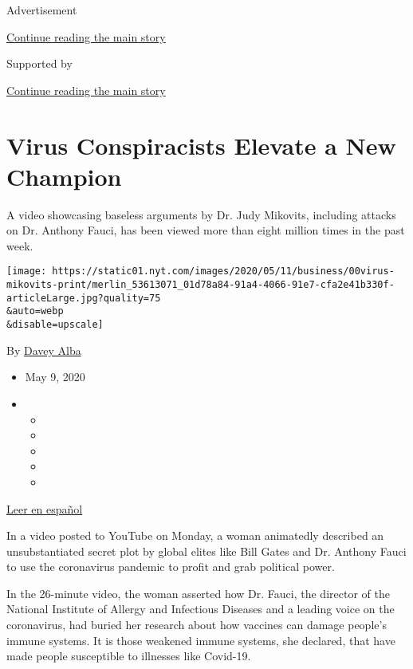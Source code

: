 Advertisement

\protect\hyperlink{after-top}{Continue reading the main story}

Supported by

\protect\hyperlink{after-sponsor}{Continue reading the main story}

\hypertarget{virus-conspiracists-elevate-a-new-champion}{%
\section{Virus Conspiracists Elevate a New
Champion}\label{virus-conspiracists-elevate-a-new-champion}}

A video showcasing baseless arguments by Dr. Judy Mikovits, including
attacks on Dr. Anthony Fauci, has been viewed more than eight million
times in the past week.

\texttt{[image: https://static01.nyt.com/images/2020/05/11/business/00virus-mikovits-print/merlin\_53613071\_01d78a84-91a4-4066-91e7-cfa2e41b330f-articleLarge.jpg?quality=75\\\&auto=webp\\\&disable=upscale]}

By \href{https://www.nytimes.com/by/davey-alba}{Davey Alba}

\begin{itemize}
\item
  May 9, 2020
\item
  \begin{itemize}
  \item
  \item
  \item
  \item
  \item
  \end{itemize}
\end{itemize}

\href{https://www.nytimes.com/es/2020/05/11/espanol/plandemia-judy-mikovitz-desinformacion.html}{Leer
en español}

In a video posted to YouTube on Monday, a woman animatedly described an
unsubstantiated secret plot by global elites like Bill Gates and Dr.
Anthony Fauci to use the coronavirus pandemic to profit and grab
political power.

In the 26-minute video, the woman asserted how Dr. Fauci, the director
of the National Institute of Allergy and Infectious Diseases and a
leading voice on the coronavirus, had buried her research about how
vaccines can damage people's immune systems. It is those weakened immune
systems, she declared, that have made people susceptible to illnesses
like Covid-19.

